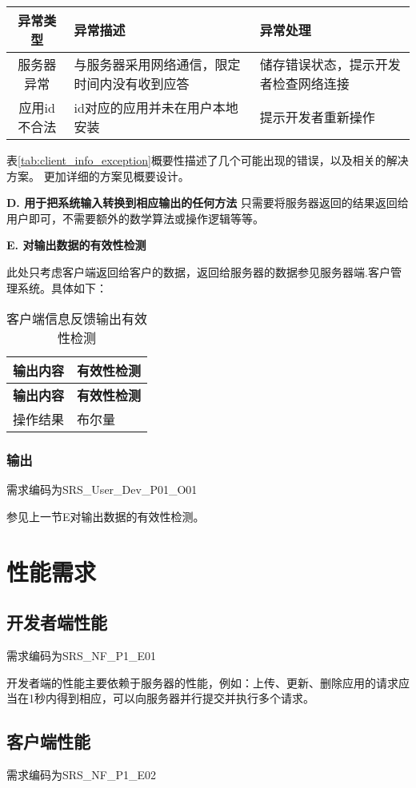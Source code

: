{\begin{longtable}{|c|p{6cm}|p{6cm}|}
\hline
\textbf{异常类型} & \textbf{异常描述} & \textbf{异常处理}\\
\hline
\endhead
\hline 
\endfoot
\hline
\endlastfoot
服务器异常 & 
与服务器采用网络通信，限定时间内没有收到应答 &
储存错误状态，提示开发者检查网络连接\\
应用id不合法 
& id对应的应用并未在用户本地安装
& 提示开发者重新操作
\end{longtable}

表\ref{tab:client_info_exception}概要性描述了几个可能出现的错误，以及相关的解决方案。
更加详细的方案见概要设计。

\textbf{D. 用于把系统输入转换到相应输出的任何方法}
只需要将服务器返回的结果返回给用户即可，不需要额外的数学算法或操作逻辑等等。
		
\textbf{E. 对输出数据的有效性检测}

此处只考虑客户端返回给客户的数据，返回给服务器的数据参见服务器端.客户管理系统。具体如下：
\begin{longtable}{|p{7cm}|p{7cm}|}
\caption{客户端信息反馈输出有效性检测}\label{tab:concrete_dev_sys_output_valid} \\
\hline
\textbf{输出内容} & \textbf{有效性检测} \\
\hline
\endfirsthead
\hline
\textbf{输出内容} & \textbf{有效性检测} \\
\hline
\endhead
\hline 
\endfoot
\hline
\endlastfoot
操作结果 & 布尔量

\end{longtable}


\subsubsection{输出}
需求编码为SRS\_User\_Dev\_P01\_O01

参见上一节E对输出数据的有效性检测。

}

\section{性能需求}

\subsection{开发者端性能}
需求编码为SRS\_NF\_P1\_E01

开发者端的性能主要依赖于服务器的性能，例如：上传、更新、删除应用的请求应当在1秒内得到相应，可以向服务器并行提交并执行多个请求。

\subsection{客户端性能}
需求编码为SRS\_NF\_P1\_E02

